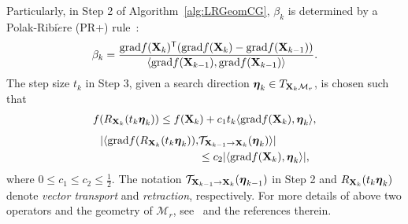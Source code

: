 \documentclass[letterpaper]{article}
\def\M{\mathcal{M}}
\def\U{{\bf U}}
\def\V{{\bf V}}
\def\diag{\mbox{diag}}
\def\bsigma{\mbox{{\boldmath $\sigma$}}}
\def\trsp{{\sf T}}
\def\G{{\bf G}}
\def\grad{{\text{grad}}}
\def\bfeta{\mbox{{\boldmath $\eta$}}}
\def\mT{{\mathcal T}}
\def\bX{{\bf X}}
\def\bX{{\bf X}}
\begin{document}
Particularly, in Step 2 of Algorithm~\ref{alg:LRGeomCG}, $\beta_{k}$ is determined by a Polak-Ribi$\grave{e}$re (PR+) rule~\cite{vandereycken2013lowrank}:
\begin{eqnarray}\label{eq:beta}
\beta_{k} = \frac{\grad f(\bX_{k})^{\trsp}(\grad f(\bX_{k}) - \grad f(\bX_{k-1}))}{\langle \grad f(\bX_{k-1}),\grad f(\bX_{k-1})\rangle}.
\end{eqnarray}
\noindent
The step size $t_{k}$ in Step 3, given a search direction $\bfeta_{k} \in T_{\bX_{k} \M_{r}}$, is chosen such that
\begin{align}\label{eq:choose_step_size}
  f(R_{\bX_{k}} (t_{k} \bfeta_{k})) \leq f(\bX_{k}) + c_{1} t_{k} \langle \grad f(\bX_{k}), \bfeta_{k} \rangle ,
\end{align}
\begin{align}\label{eq+choose_step_size2}
  | \langle \grad f(R_{\bX_{k}} (t_{k} \bfeta_{k})), & \mT_{\bX_{k-1} \rightarrow \bX_{k}} (\bfeta_{k}) \rangle |  \nonumber \\
                           & \leq c_{2} | \langle \grad f(\bX_{k}), \bfeta_{k} \rangle |  ,
\end{align}
\noindent
where $0 \leq c_{1} \leq c_{2} \leq \frac{1}{2}$.
The notation $\mT_{\bX_{k-1} \rightarrow \bX_{k}} (\bfeta_{k-1})$ in Step 2 and $R_{\bX_{k}} (t_k \bfeta_{k})$ denote \emph{vector transport} and \emph{retraction}, respectively.
For more details of above two operators and the geometry of $\M_{r}$, see~\cite{vandereycken2013lowrank} and the references therein.


\end{document}
